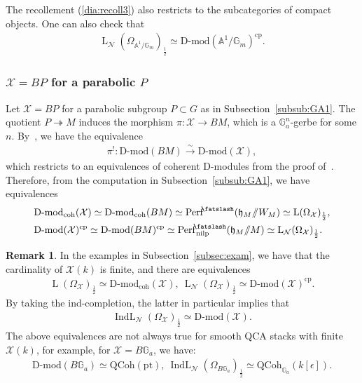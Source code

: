 \documentclass [11pt,oneside,a4paper,mathscr]{amsart}
\theoremstyle{definition}
\newtheorem{remark}[thm]{Remark}
\newcommand{\LL}{\operatorname{L}}
\newcommand{\X}{\mathcal{X}}
\newcommand{\IndL}{\operatorname{IndL}}
\newcommand{\shear}{{\mathbin{\mkern-6mu\fatslash}}}
\newcommand{\ssslash}{/\!\!/}
\begin{document}
The recollement (\ref{dia:recoll3}) also restricts to the subcategories of compact objects. 
One can also check that 
\begin{align*}
    \LL_{\mathcal{N}}(\Omega_{\mathbb{A}^1/\mathbb{G}_m})_{\frac{1}{2}} \simeq \text{D-mod}(\mathbb{A}^1/\mathbb{G}_m)^{\mathrm{cp}}.
\end{align*}

\subsubsection{$\mathcal{X}=BP$ for a parabolic $P$}
Let $\X=BP$ for a parabolic subgroup $P\subset G$ as in Subsection~\ref{subsub:GA1}.
The quotient $P\twoheadrightarrow M$ induces the morphism
$\pi \colon \X \to BM$, 
which is a $\mathbb{G}_a^n$-gerbe for some $n$. By~\cite[Lemma~10.3.6]{MR3037900}, 
we have the equivalence
\begin{align*}
    \pi^! \colon \text{D-mod}(BM) \stackrel{\sim}{\to} \text{D-mod}(\X),
\end{align*}
which restricts to an equivalences of coherent D-modules from the 
proof of~\cite[Lemma~10.3.6]{MR3037900}. 
Therefore, from the computation in Subsection~\ref{subsub:GA1}, we have equivalences
\begin{align*}
&\text{D-mod}_{\mathrm{coh}}(\X)\simeq \text{D-mod}_{\mathrm{coh}}(BM)
\simeq\mathrm{Perf}^{\shear}(\mathfrak{h}_M\ssslash W_M) \simeq
    \LL(\Omega_{\X})_{\frac{1}{2}}, \\
& \text{D-mod}(\X)^{\mathrm{cp}} \simeq \text{D-mod}(BM)^{\mathrm{cp}}
\simeq \mathrm{Perf}^{\shear}_{\mathrm{nilp}}(\mathfrak{h}_M\ssslash M) \simeq
    \LL_{\mathcal{N}}(\Omega_{\X})_{\frac{1}{2}}.
\end{align*}


\begin{remark}\label{rmk:eqD}
In the examples in Subsection~\ref{subsec:exam},
we have that the cardinality of  $\X(k)$ is finite, and there are equivalences
\begin{align*}
    \LL(\Omega_{\X})_{\frac{1}{2}} \simeq \text{D-mod}_{\mathrm{coh}}(\X), \ 
     \LL_{\mathcal{N}}(\Omega_{\X})_{\frac{1}{2}} \simeq \text{D-mod}(\X)^{\mathrm{cp}}.
\end{align*}
By taking the ind-completion, the latter in particular implies that 
\begin{align*}
    \IndL_{\mathcal{N}}(\Omega_{\X})_{\frac{1}{2}} \simeq \text{D-mod}(\X).
\end{align*}
The above equivalences are not always true for smooth QCA stacks with finite $\X(k)$, for example, for
$\X=B\mathbb{G}_a$, we have:
\begin{align*}
    \text{D-mod}(B\mathbb{G}_a)\simeq \mathrm{QCoh}(\mathrm{pt}), \ \IndL_{\mathcal{N}}(\Omega_{B\mathbb{G}_a})_{\frac{1}{2}}\simeq \mathrm{QCoh}_{\mathbb{G}_a}(k[\epsilon]).
\end{align*}
\end{remark}
\end{document}
